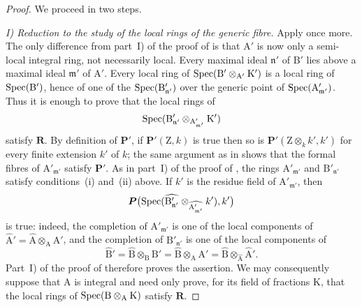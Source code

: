 \begin{proof}
We proceed in two steps.

\emph{I) Reduction to the study of the local rings of the generic fibre.} Apply  once more. The only difference from part~I) of the proof of  is that $\mathrm{A}'$ is now only a semi-local integral ring, not necessarily local. Every maximal ideal $\mathfrak{n}'$ of $\mathrm{B}'$ lies above a maximal ideal $\mathfrak{m}'$ of $\mathrm{A}'$. Every local ring of $\operatorname{Spec}(\mathrm{B}'\otimes_{\mathrm{A}'}\mathrm{K}')$ is a local ring of $\operatorname{Spec}(\mathrm{B}')$, hence of one of the $\operatorname{Spec}(\mathrm{B}'_{\mathfrak{n}'})$ over the generic point of $\operatorname{Spec}(\mathrm{A}'_{\mathfrak{m}'})$. Thus it is enough to prove that the local rings of
\[
  \operatorname{Spec}(\mathrm{B}'_{\mathfrak{n}'}\otimes_{\mathrm{A}'_{\mathfrak{m}'}}\mathrm{K}')
\]
satisfy $\boldsymbol{R}$. By definition of $\boldsymbol{P}'$, if $\boldsymbol{P}'(\mathrm{Z},k)$ is true then so is $\boldsymbol{P}'(\mathrm{Z}\otimes_k k',k')$ for every finite extension $k'$ of $k$; the same argument as in  shows that the formal fibres of $\mathrm{A}'_{\mathfrak{m}'}$ satisfy $\boldsymbol{P}'$. As in part~I) of the proof of , the rings $\mathrm{A}'_{\mathfrak{m}'}$ and $\mathrm{B}'_{\mathfrak{n}'}$ satisfy conditions~(i) and~(ii) above. If $k'$ is the residue field of $\mathrm{A}'_{\mathfrak{m}'}$, then
\[
  \boldsymbol{P}\bigl(\operatorname{Spec}(\widehat{\mathrm{B}'_{\mathfrak{n}'}}\otimes_{\widehat{\mathrm{A}'_{\mathfrak{m}'}}}k'),k'\bigr)
\]
is true: indeed, the completion of $\mathrm{A}'_{\mathfrak{m}'}$ is one of the local components of $\widehat{\mathrm{A}}'=\widehat{\mathrm{A}}\otimes_\mathrm{A}\mathrm{A}'$, and the completion of $\mathrm{B}'_{\mathfrak{n}'}$ is one of the local components of
\[
  \widehat{\mathrm{B}}'=\widehat{\mathrm{B}}\otimes_\mathrm{B}\mathrm{B}'
  =\widehat{\mathrm{B}}\otimes_\mathrm{A}\mathrm{A}'
  =\widehat{\mathrm{B}}\otimes_{\widehat{\mathrm{A}}}\widehat{\mathrm{A}}'.
\]
Part~I) of the proof of  therefore proves the assertion. We may consequently suppose that $\mathrm{A}$ is integral and need only prove, for its field of fractions $\mathrm{K}$, that the local rings of $\operatorname{Spec}(\mathrm{B}\otimes_\mathrm{A}\mathrm{K})$ satisfy $\boldsymbol{R}$.


\end{proof}
